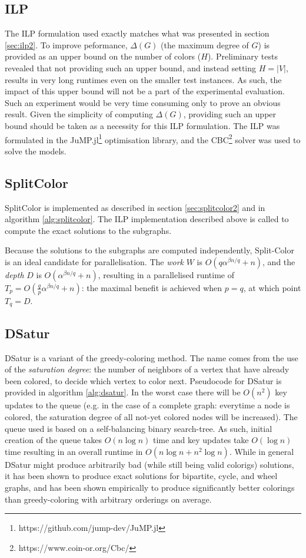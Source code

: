 \documentclass[twocolumn]{article}
\begin{document}
\subsection{ILP}
The ILP formulation used exactly matches what was presented in section \ref{sec:ilp2}. To improve peformance, $\Delta(G)$ (the maximum degree of $G$) is provided as an upper bound on the number of colors ($H$). Preliminary tests revealed that not providing such an upper bound, and instead setting $H = |V|$, results in very long runtimes even on the smaller test instances. As such, the impact of this upper bound will not be a part of the experimental evaluation. Such an experiment would be very time consuming only to prove an obvious result. Given the simplicity of computing $\Delta(G)$, providing such an upper bound should be taken as a necessity for this ILP formulation. The ILP was formulated in the \textsf{JuMP.jl}\footnote{https://github.com/jump-dev/JuMP.jl} optimisation library, and the CBC\footnote{https://www.coin-or.org/Cbc/} solver was used to solve the models.

\subsection{SplitColor}
SplitColor is implemented as described in section \ref{sec:splitcolor2} and in algorithm \ref{alg:splitcolor}. The ILP implementation described above is called to compute the exact solutions to the subgraphs. 

Because the solutions to the subgraphs are computed independently, Split-Color is an ideal candidate for parallelisation. The \emph{work} $W$ is $O(q\alpha^{\beta n / q} + n)$, and the \emph{depth} $D$ is $O(\alpha^{\beta n / q} + n)$, resulting in a parallelised runtime of $T_p = O(\frac{q}{p}\alpha^{\beta n / q} + n)$: the maximal benefit is achieved when $p = q$, at which point $T_q = D$.

\subsection{DSatur}
DSatur is a variant of the greedy-coloring method. The name comes from the use of the \emph{saturation degree}: the number of neighbors of a vertex that have already been colored, to decide which vertex to color next. Pseudocode for DSatur is provided in algorithm \ref{alg:dsatur}. In the worst case there will be $O(n^2)$ key updates to the queue (e.g. in the case of a complete graph: everytime a node is colored, the saturation degree of all not-yet colored nodes will be increased). The queue used is based on a self-balancing binary search-tree. As such, initial creation of the queue takes $O(n\log n)$ time and key updates take $O(\log n)$ time resulting in an overall runtime in $O(n\log n + n^2\log n)$. While in general DSatur might produce arbitrarily bad (while still being valid colorigs) solutions, it has been shown to produce exact solutions for bipartite, cycle, and wheel graphs, and has been shown empirically to produce significantly better colorings than greedy-coloring with arbitrary orderings on average.
\end{document}

